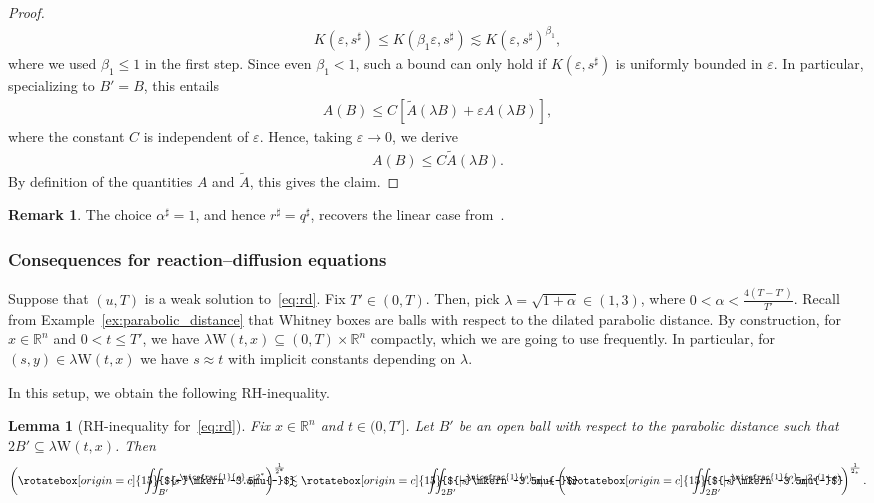 \documentclass[11pt, leqno]{amsart}
\newtheorem{lemma}[theorem]{Lemma}
\theoremstyle{definition}
\newtheorem{remark}[theorem]{Remark}
\newcommand{\R}{\mathbb{R}}
\newcommand{\W}{\mathrm{W}}
\newcommand{\WB}{\mathrm{W}}
\newcommand{\eps}{\varepsilon}
\newcommand{\wt}{\widetilde}
\def\Yint#1{\mathchoice
	{\YYint\displaystyle\textstyle{#1}}%
	{\YYint\textstyle\scriptstyle{#1}}%
	{\YYint\scriptstyle\scriptscriptstyle{#1}}%
	{\YYint\scriptscriptstyle\scriptscriptstyle{#1}}%
	\!\iint}
\def\YYint#1#2#3{{\setbox0=\hbox{$#1{#2#3}{\iint}$}
		\vcenter{\hbox{$#2#3$}}\kern-.51\wd0}}
\def\longdash{{-}\mkern-3.5mu{-}}
\def\tiltlongdash{\rotatebox[origin=c]{15}{$\longdash$}}
\def\tiltfiint{\Yint\longdash}
\def\tiltfiint{\Yint\tiltlongdash}
\begin{document}
\begin{proof}
		\begin{align}
			K(\eps, s^\sharp) \leq K(\beta_1 \eps, s^\sharp) \lesssim K(\eps, s^\sharp)^{\beta_1},
		\end{align}
		where we used $\beta_1 \leq 1$ in the first step. Since even $\beta_1 < 1$, such a bound can only hold if $K(\eps, s^\sharp)$ is uniformly bounded in $\eps$. In particular, {specializing to $B' = B$,} this entails
		\begin{align}
			A(B) \leq C \left[ \wt A(\lambda B) + \eps A(\lambda B) \right],
		\end{align}
		where the constant $C$ is independent of $\eps$. Hence, taking $\eps \to 0$, we derive
		\begin{align}
			A(B) \leq C \wt A(\lambda B).
		\end{align}
		By definition of the quantities $A$ and $\wt A$, this gives the claim.
	\end{proof}

	{
	\begin{remark}
		The choice $\alpha^\sharp = 1$, and hence $r^\sharp = q^\sharp$, recovers the linear case from~\cite{BCF}.
	\end{remark}
	}

	\subsubsection{Consequences for reaction--diffusion equations}
	\label{subsec:regularity_weak_rd}

	Suppose that $(u,T)$ is a weak solution to~\eqref{eq:rd}. Fix $T' \in (0,T)$.
	Then, pick $\lambda = \sqrt{1 + \alpha} \in (1,3)$, where $0 < \alpha < \tfrac{4(T-T')}{T'}$.
	Recall from Example~\ref{ex:parabolic_distance} that Whitney boxes are balls with respect to the dilated parabolic distance.
	By construction, for $x\in \R^n$ and $0 < t \leq T'$, we have $\lambda \WB(t,x) \subseteq (0,T) \times \R^n$ compactly, which we are going to use frequently. In particular, for $(s,y) \in \lambda \W(t,x)$ we have $s \approx t$ with implicit constants depending on $\lambda$.

	In this setup, we obtain the following RH-inequality.

	\begin{lemma}[RH-inequality for~\eqref{eq:rd}]
		\label{lem:RH_rd}
		Fix $x\in \R^n$ and $t \in (0, T']$. Let $B'$ be an open ball with respect to the parabolic distance such that $2B' \subseteq \lambda \WB(t,x)$.
		Then
		\begin{align}
			\left( \tiltfiint_{B'} |s^{\nicefrac{1}{\rho}} u|^{2^*} \right)^\frac{1}{2^*}
			\lesssim \tiltfiint_{2B'} |s^{\nicefrac{1}{\rho}} u| + \left( \tiltfiint_{2B'} |s^{\nicefrac{1}{\rho}} u|^{2_*(1+\rho)} \right)^\frac{1}{2_*}.
		\end{align}
	\end{lemma}
\end{document}
